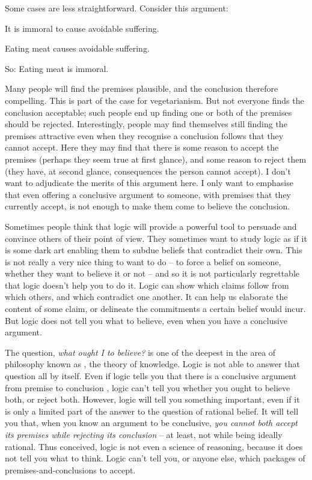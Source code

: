 Some cases are less straightforward. Consider this argument: \begin{earg}
	\item[] It is immoral to cause avoidable suffering. 
	\item[] Eating meat causes avoidable suffering.
	\item[So:] Eating meat is immoral.
\end{earg}
Many people will find the premises plausible, and the conclusion therefore compelling. This is part of the case for vegetarianism. But not everyone finds the conclusion acceptable; such people end up finding one or both of the premises should be rejected. Interestingly, people may find themselves still finding the premises attractive even when they recognise a conclusion follows that they cannot accept. Here they may find that there is some reason to accept the premises (perhaps they seem true at first glance), and some reason to reject them (they have, at second glance, consequences the person cannot accept). I don't want to adjudicate the merits of this argument here. I only want to emphasise that even offering a conclusive argument to someone, with premises that they currently accept, is not enough to make them come to believe the conclusion.

Sometimes people think that logic will provide a powerful tool to persuade and convince others of their point of view. They sometimes want to study logic as if it is some dark art enabling them to subdue beliefs that contradict their own. This is not really a very nice thing to want to do – to force a belief on someone, whether they want to believe it or not – and so it is not particularly regrettable that logic doesn't help you to do it. Logic can show which claims follow from which others, and which contradict one another. It can help us elaborate the content of some claim, or delineate the commitments a certain belief would incur. But logic does not tell you what to believe, even when you have a conclusive argument.


The question, \emph{what ought I to believe?} is one of the deepest in the area of philosophy known as , the theory of knowledge. Logic is not able to answer that question all by itself. Even if logic tells you that there is a conclusive argument from premise  to conclusion , logic can't tell you whether you ought to believe both, or reject both. However, logic will tell you something important, even if it is only a limited part of the answer to the question of rational belief. It will tell you that, when you know an argument to be conclusive, \emph{you cannot both accept its premises while rejecting its conclusion} – at least, not while being ideally rational. Thus conceived, logic is not even a science of reasoning, because it does not tell you what to think. Logic can't tell you, or anyone else, which packages of premises-and-conclusions to accept.


